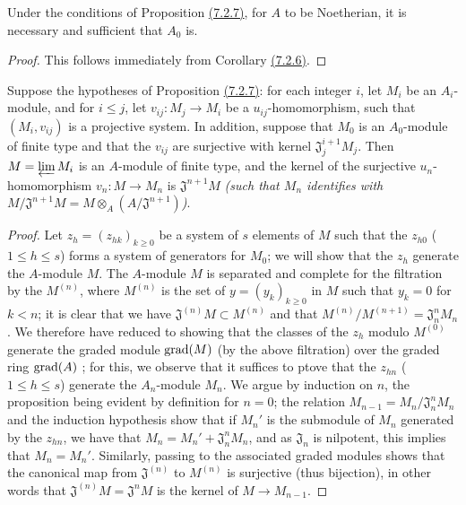\begin{cor}[7.2.8]
\label{0.7.2.8}
Under the conditions of Proposition \hyperref[0.7.2.7]{(7.2.7)}, for $A$ to
be Noetherian, it is necessary and sufficient that $A_0$ is.
\end{cor}

\begin{proof}
\label{proof-0.7.2.8}
This follows immediately from Corollary \hyperref[0.7.2.6]{(7.2.6)}.
\end{proof}

\begin{prop}[7.2.9]
\label{0.7.2.9}
Suppose the hypotheses of Proposition \hyperref[0.7.2.7]{(7.2.7)}: for each integer $i$,
let $M_i$ be an $A_i$-module, and for $i\leqslant j$, let $v_{ij}:M_j\to M_i$ be a
$u_{ij}$-homomorphism, such that $(M_i,v_{ij})$ is a projective system. In addition, suppose
that $M_0$ is an $A_0$-module of finite type and that the $v_{ij}$ are surjective with kernel
$\mathfrak{J}_j^{i+1}M_j$. Then $M=\varprojlim M_i$ is an $A$-module of finite type, and the
kernel of the surjective $u_n$-homomorphism $v_n:M\to M_n$ is $\mathfrak{J}^{n+1}M$
{\em (such that $M_n$ identifies with
$M/\mathfrak{J}^{n+1}M=M\otimes_A(A/\mathfrak{J}^{n+1})$)}.
\end{prop}

\begin{proof}
\label{proof-0.7.2.9}
Let $z_h=(z_{hk})_{k\geqslant 0}$ be a system of $s$ elements of $M$ such that the $z_{h0}$
($1\leqslant h\leqslant s$) forms a system of generators for $M_0$; we will show that the
$z_h$ generate the $A$-module $M$. The $A$-module $M$ is separated and complete for the
filtration by the $M^{(n)}$, where $M^{(n)}$ is the set of $y=(y_k)_{k\geqslant 0}$ in $M$
such that $y_k=0$ for $k<n$; it is clear that we have $\mathfrak{J}^{(n)}M\subset M^{(n)}$
and that $M^{(n)}/M^{(n+1)}=\mathfrak{J}_n^n M_n$. We therefore have reduced to showing that
the classes of the $z_h$ modulo $M^{(0)}$ generate the graded module ${\mathop{\mathrm{grad}}\nolimits}(M)$ (by the
above filtration) over the graded ring ${\mathop{\mathrm{grad}}\nolimits}(A)$ \cite[p. 18--06, lemme]{I-1}; for this, we
observe that it suffices to ptove that the $z_{hn}$ ($1\leqslant h\leqslant s$) generate the
$A_n$-module $M_n$. We argue by induction on $n$, the proposition being evident by definition
for $n=0$; the relation $M_{n-1}=M_n/\mathfrak{J}_n^n M_n$ and the induction hypothesis show
that if $M_n'$ is the submodule of $M_n$ generated by the $z_{hn}$, we have that
$M_n=M_n'+\mathfrak{J}_n^n M_n$, and as $\mathfrak{J}_n$ is nilpotent, this implies that
$M_n=M_n'$. Similarly, passing to the associated graded modules shows that the canonical map
from $\mathfrak{J}^{(n)}$ to $M^{(n)}$ is surjective (thus bijection), in other words that
$\mathfrak{J}^{(n)}M=\mathfrak{J}^n M$ is the kernel of $M\to M_{n-1}$.
\end{proof}

